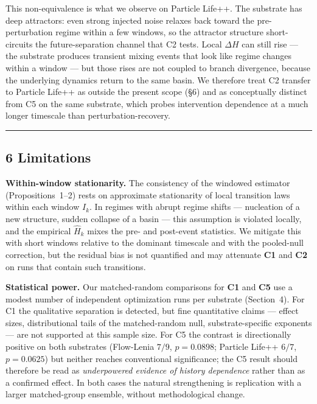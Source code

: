 \documentclass[
  11pt,
]{article}
\begin{document}
This non-equivalence is what we observe on Particle Life++.
The substrate has deep attractors: even strong injected noise
relaxes back toward the pre-perturbation regime within a few
windows, so the attractor structure short-circuits the
future-separation channel that C2 tests. Local $\Delta H$ can
still rise --- the substrate produces transient mixing events
that look like regime changes within a window --- but those
rises are not coupled to branch divergence, because the
underlying dynamics return to the same basin. We therefore
treat C2 transfer to Particle Life++ as outside the present
scope (\S6) and as conceptually distinct from C5 on the same
substrate, which probes intervention dependence at a much
longer timescale than perturbation-recovery.

\begin{center}\rule{0.5\linewidth}{0.5pt}\end{center}

\subsection{6 Limitations}\label{limitations}

\textbf{Within-window stationarity.} The consistency of the
windowed estimator (Propositions~1--2) rests on approximate
stationarity of local transition laws within each window
$I_k$. In regimes with abrupt regime shifts --- nucleation of
a new structure, sudden collapse of a basin --- this assumption
is violated locally, and the empirical $\widehat{H}_k$ mixes
the pre- and post-event statistics. We mitigate this with
short windows relative to the dominant timescale and with the
pooled-null correction, but the residual bias is not
quantified and may attenuate \textbf{C1} and \textbf{C2} on
runs that contain such transitions.

\textbf{Statistical power.} Our matched-random comparisons
for \textbf{C1} and \textbf{C5} use a modest number of
independent optimization runs per substrate (Section~4).
For C1 the qualitative separation is detected, but fine
quantitative claims --- effect sizes, distributional tails of
the matched-random null, substrate-specific exponents --- are
not supported at this sample size. For C5 the contrast is
directionally positive on both substrates (Flow-Lenia $7/9$,
$p=0.0898$; Particle Life++ $6/7$, $p=0.0625$) but neither
reaches conventional significance; the C5 result should
therefore be read as \emph{underpowered evidence of history
dependence} rather than as a confirmed effect. In both cases
the natural strengthening is replication with a larger
matched-group ensemble, without methodological change.
\end{document}
